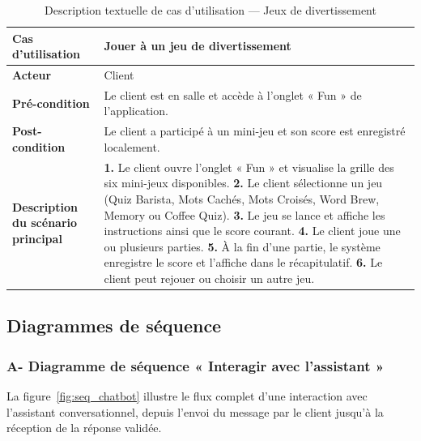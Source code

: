 \begin{table}[H]
\centering
\caption{Description textuelle de cas d'utilisation — Jeux de divertissement}
\label{tab:uc_games}
\renewcommand{\arraystretch}{1.5}
\begin{tabular}{|p{4cm}|p{9.5cm}|}
\hline
\textbf{Cas d'utilisation} & Jouer à un jeu de divertissement \\
\hline
\textbf{Acteur} & Client \\
\hline
\textbf{Pré-condition} & Le client est en salle et accède à l'onglet « Fun » de l'application. \\
\hline
\textbf{Post-condition} & Le client a participé à un mini-jeu et son score est enregistré localement. \\
\hline
\textbf{Description du scénario principal} &
  \textbf{1.} Le client ouvre l'onglet « Fun » et visualise la grille des six mini-jeux disponibles. \newline
  \textbf{2.} Le client sélectionne un jeu (Quiz Barista, Mots Cachés, Mots Croisés, Word Brew, Memory ou Coffee Quiz). \newline
  \textbf{3.} Le jeu se lance et affiche les instructions ainsi que le score courant. \newline
  \textbf{4.} Le client joue une ou plusieurs parties. \newline
  \textbf{5.} À la fin d'une partie, le système enregistre le score et l'affiche dans le récapitulatif. \newline
  \textbf{6.} Le client peut rejouer ou choisir un autre jeu. \\
\hline
\end{tabular}
\end{table}

\subsection{Diagrammes de séquence}

\subsubsection*{A- Diagramme de séquence « Interagir avec l'assistant »}

La figure~\ref{fig:seq_chatbot} illustre le flux complet d'une interaction avec
l'assistant conversationnel, depuis l'envoi du message par le client jusqu'à la
réception de la réponse validée.

